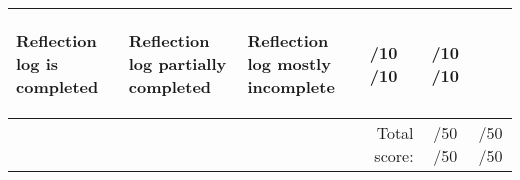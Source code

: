 \documentclass[11pt,landscape]{amsart}
\begin{document}
\begin{tabular}{llllcc}
\begin{minipage}{2.5in} \begin{list}{}{\leftmargin=1em}
\item  Reflection log is completed 
\end{list}
\end{minipage}\vspace{.5in}

&

\begin{minipage}{2.5in}\begin{list}{}{\leftmargin=1em}
\item  Reflection log partially completed \end{list}
\end{minipage}

&

\begin{minipage}{2.5in}\begin{list}{}{\leftmargin=1em}
\item Reflection log mostly incomplete
\end{list}
\end{minipage}
& \begin{minipage}{0.4in}\underline{\hspace{.25in}}/10  \underline{\hspace{.25in}}/10\end{minipage} 
& \begin{minipage}{0.4in}\underline{\hspace{.25in}}/10  \underline{\hspace{.25in}}/10\end{minipage} 
\\[2pt]\midrule


 & & \multicolumn{1}{r}{} & \multicolumn{1}{r}{Total score:}
 & \begin{minipage}{0.4in}\underline{\hspace{.25in}}/50  \underline{\hspace{.25in}}/50\end{minipage} 
& \begin{minipage}{0.4in}\underline{\hspace{.25in}}/50  \underline{\hspace{.25in}}/50\end{minipage} 


\end{tabular}
\end{document}

